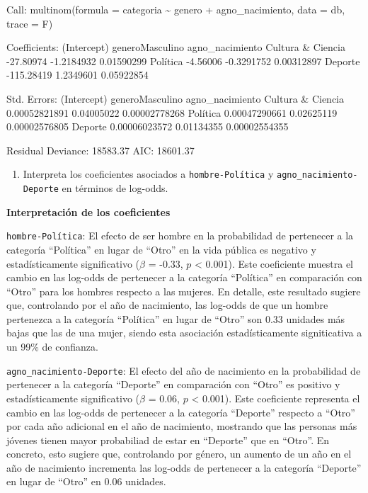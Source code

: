 \documentclass[
  12pt,
  a4paper,
]{article}
\providecommand{\tightlist}{%
  \setlength{\itemsep}{0pt}\setlength{\parskip}{0pt}}
\begin{document}
Call:
multinom(formula = categoria \textasciitilde{} genero + agno\_nacimiento, data = db,
trace = F)

Coefficients:
(Intercept) generoMasculino agno\_nacimiento
Cultura \& Ciencia -27.80974 -1.2184932 0.01590299
Política -4.56006 -0.3291752 0.00312897
Deporte -115.28419 1.2349601 0.05922854

Std. Errors:
(Intercept) generoMasculino agno\_nacimiento
Cultura \& Ciencia 0.00052821891 0.04005022 0.00002778268
Política 0.00047290661 0.02625119 0.00002576805
Deporte 0.00006023572 0.01134355 0.00002554355

Residual Deviance: 18583.37
AIC: 18601.37

\begin{enumerate}
\def\labelenumi{\alph{enumi})}
\tightlist
\item
  Interpreta los coeficientes asociados a \texttt{hombre-Política} y \texttt{agno\_nacimiento-Deporte} en términos de log-odds.
\end{enumerate}

\textbf{Interpretación de los coeficientes}

\texttt{hombre-Política}: El efecto de ser hombre en la probabilidad de pertenecer a la categoría ``Política'' en lugar de ``Otro'' en la vida pública es negativo y estadísticamente significativo (\(\beta\) = -0.33, \(p\) \textless{} 0.001). Este coeficiente muestra el cambio en las log-odds de pertenecer a la categoría ``Política'' en comparación con ``Otro'' para los hombres respecto a las mujeres. En detalle, este resultado sugiere que, controlando por el año de nacimiento, las log-odds de que un hombre pertenezca a la categoría ``Política'' en lugar de ``Otro'' son 0.33 unidades más bajas que las de una mujer, siendo esta asociación estadísticamente signiticativa a un 99\% de confianza.

\texttt{agno\_nacimiento-Deporte}: El efecto del año de nacimiento en la probabilidad de pertenecer a la categoría ``Deporte'' en comparación con ``Otro'' es positivo y estadísticamente significativo (\(\beta\) = 0.06, \(p\) \textless{} 0.001). Este coeficiente representa el cambio en las log-odds de pertenecer a la categoría ``Deporte'' respecto a ``Otro'' por cada año adicional en el año de nacimiento, mostrando que las personas más jóvenes tienen mayor probabiliad de estar en ``Deporte'' que en ``Otro''. En concreto, esto sugiere que, controlando por género, un aumento de un año en el año de nacimiento incrementa las log-odds de pertenecer a la categoría ``Deporte'' en lugar de ``Otro'' en 0.06 unidades.
\end{document}
